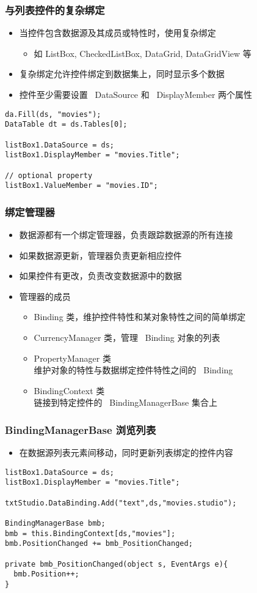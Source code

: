 \begin{frame}[fragile]
\frametitle{与列表控件的复杂绑定}
\begin{itemize}
\item 当控件包含数据源及其成员或特性时，使用复杂绑定
\begin{itemize}
\item 如 ListBox, CheckedListBox, DataGrid, DataGridView 等
\end{itemize}
\item 复杂绑定允许控件绑定到数据集上，同时显示多个数据
\item 控件至少需要设置 ~DataSource 和 ~DisplayMember 两个属性
\end{itemize}
\begin{lstlisting}
da.Fill(ds, "movies");
DataTable dt = ds.Tables[0];

listBox1.DataSource = ds;
listBox1.DisplayMember = "movies.Title";

// optional property
listBox1.ValueMember = "movies.ID";
\end{lstlisting}
\end{frame}

\begin{frame}[fragile]
\frametitle{绑定管理器}
\begin{itemize}
\item 数据源都有一个绑定管理器，负责跟踪数据源的所有连接
\item 如果数据源更新，管理器负责更新相应控件
\item 如果控件有更改，负责改变数据源中的数据
\item 管理器的成员
\begin{itemize}
\item Binding 类，维护控件特性和某对象特性之间的简单绑定
\item CurrencyManager 类，管理 ~Binding 对象的列表
\item PropertyManager 类\\维护对象的特性与数据绑定控件特性之间的 ~Binding
\item BindingContext 类\\链接到特定控件的 ~BindingManagerBase 集合上
\end{itemize}
\end{itemize}
\end{frame}

\begin{frame}[fragile]
\frametitle{BindingManagerBase 浏览列表}
\begin{itemize}
\item 在数据源列表元素间移动，同时更新列表绑定的控件内容
\end{itemize}
\begin{lstlisting}
listBox1.DataSource = ds;
listBox1.DisplayMember = "movies.Title";

txtStudio.DataBinding.Add("text",ds,"movies.studio");

BindingManagerBase bmb;
bmb = this.BindingContext[ds,"movies"];
bmb.PositionChanged += bmb_PositionChanged;

private bmb_PositionChanged(object s, EventArgs e){
  bmb.Position++;
}
\end{lstlisting}
\end{frame}

